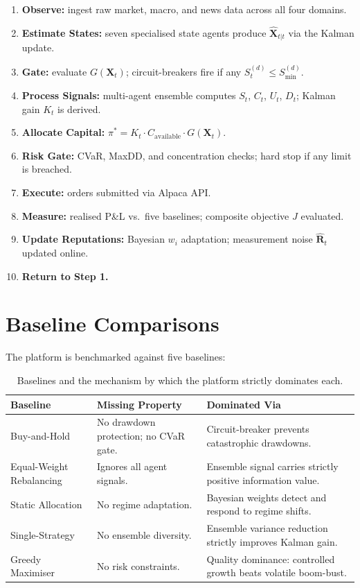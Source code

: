 \documentclass[12pt,openany]{book}
\numberwithin{equation}{chapter}
\theoremstyle{plain}
\theoremstyle{definition}
\theoremstyle{remark}
\def\mathcal#1{#1}%
\begin{document}
\begin{enumerate}
  \item \textbf{Observe:} ingest raw market, macro, and news data
        across all four domains.
  \item \textbf{Estimate States:} seven specialised state agents
        produce $\hat{\mathbf{X}}_{t|t}$ via the Kalman update.
  \item \textbf{Gate:} evaluate $G(\mathbf{X}_t)$; circuit-breakers
        fire if any $\mathcal{S}_t^{(d)} \leq \mathcal{S}_{\min}^{(d)}$.
  \item \textbf{Process Signals:} multi-agent ensemble computes
        $S_t$, $C_t$, $U_t$, $D_t$; Kalman gain $K_t$ is derived.
  \item \textbf{Allocate Capital:}
        $\pi^* = K_t \cdot C_{\mathrm{available}} \cdot G(\mathbf{X}_t)$.
  \item \textbf{Risk Gate:} CVaR, MaxDD, and concentration checks;
        hard stop if any limit is breached.
  \item \textbf{Execute:} orders submitted via Alpaca API.
  \item \textbf{Measure:} realised P\&L vs.\ five baselines;
        composite objective $J$ evaluated.
  \item \textbf{Update Reputations:} Bayesian $w_i$ adaptation;
        measurement noise $\hat{\mathbf{R}}_t$ updated online.
  \item \textbf{Return to Step 1.}
\end{enumerate}

\section{Baseline Comparisons}

The platform is benchmarked against five baselines:

\begin{table}[H]
\centering
\caption{Baselines and the mechanism by which the platform
         strictly dominates each.}
\label{tab:baselines}
\small
\begin{tabularx}{\textwidth}{@{} l X X @{}}
\toprule
\textbf{Baseline} & \textbf{Missing Property}
  & \textbf{Dominated Via} \\
\midrule
Buy-and-Hold
  & No drawdown protection; no CVaR gate.
  & Circuit-breaker prevents catastrophic drawdowns. \\
Equal-Weight Rebalancing
  & Ignores all agent signals.
  & Ensemble signal carries strictly positive information value. \\
Static Allocation
  & No regime adaptation.
  & Bayesian weights detect and respond to regime shifts. \\
Single-Strategy
  & No ensemble diversity.
  & Ensemble variance reduction strictly improves Kalman gain. \\
Greedy Maximiser
  & No risk constraints.
  & Quality dominance: controlled growth beats volatile boom-bust. \\
\bottomrule
\end{tabularx}
\end{table}
\end{document}
